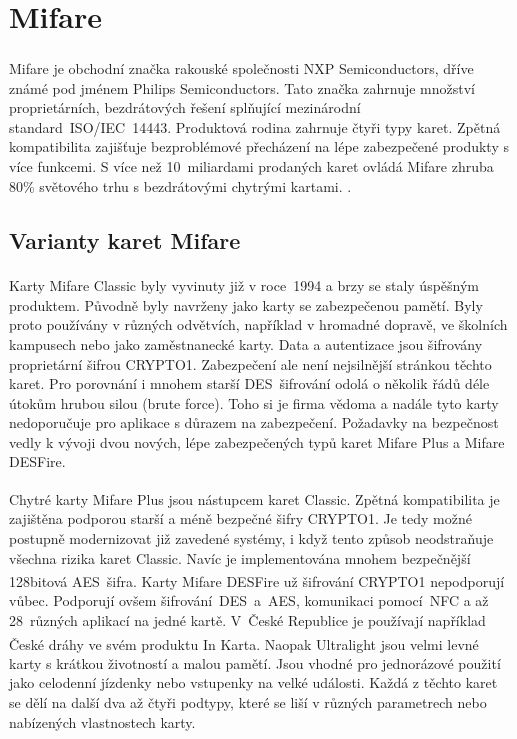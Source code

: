 \section{Mifare\textsuperscript{\textregistered}}
Mifare\textsuperscript{\textregistered} je obchodní značka rakouské společnosti NXP Semiconductors, dříve známé pod jménem Philips Semiconductors. Tato značka zahrnuje množství proprietárních, bezdrátových řešení splňující mezinárodní standard~ISO/IEC~14443. Produktová rodina zahrnuje čtyři typy karet. Zpětná kompatibilita zajišťuje bezproblémové přecházení na lépe zabezpečené produkty s více funkcemi. S více než 10~miliardami prodaných karet ovládá Mifare zhruba 80\% světového trhu s bezdrátovými chytrými kartami. 
\cite{About_Mifare}\cite{Dismantling_Mifare_Classic}.

\subsection{Varianty karet Mifare}

Karty Mifare Classic\textsuperscript{\textregistered} byly vyvinuty již v roce~1994 a brzy se staly úspěšným produktem. Původně byly navrženy jako karty se zabezpečenou pamětí. Byly proto používány v různých odvětvích, například v hromadné dopravě, ve školních kampusech nebo jako zaměstnanecké karty. Data a autentizace jsou šifrovány proprietární šifrou CRYPTO1. Zabezpečení ale není nejsilnější stránkou těchto karet. Pro porovnání i mnohem starší DES~šifrování odolá o několik řádů déle útokům hrubou silou (brute force). Toho si je firma vědoma a nadále tyto karty nedoporučuje pro aplikace s důrazem na zabezpečení. Požadavky na bezpečnost vedly k vývoji dvou nových, lépe zabezpečených typů karet Mifare Plus a Mifare DESFire\cite{Mifare_Classic_story}\cite{Mifare_Classic_Official_about}. 
\par
Chytré karty Mifare Plus\textsuperscript{\textregistered} jsou nástupcem karet Classic. Zpětná kompatibilita je zajištěna podporou starší a méně bezpečné šifry CRYPTO1. Je tedy možné postupně modernizovat již zavedené systémy, i když tento způsob neodstraňuje všechna rizika karet Classic. Navíc je implementována mnohem bezpečnější 128bitová AES~šifra. Karty Mifare DESFire\textsuperscript{\textregistered} už šifrování CRYPTO1 nepodporují vůbec. Podporují ovšem šifrování~DES~a~AES, komunikaci pomocí~NFC a až 28~různých aplikací na jedné kartě\cite{Mifare_Classic_Official_about}. V~České Republice je používají například České dráhy ve svém produktu In Karta\cite{Ceske_Drahy_Podminky_InKarta}. Naopak Ultralight\textsuperscript{\textregistered} jsou velmi levné karty s krátkou životností a malou pamětí. Jsou vhodné pro jednorázové použití jako celodenní jízdenky nebo vstupenky na velké události\cite{Mifare_Classic_Official_about}. Každá z těchto karet se dělí na další dva až čtyři podtypy, které se liší v různých parametrech nebo nabízených vlastnostech karty.

